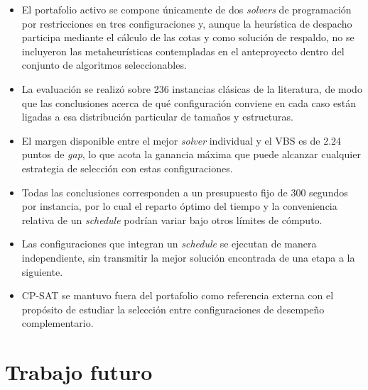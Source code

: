 \begin{itemize}
  \item El portafolio activo se compone únicamente de dos \textit{solvers} de
    programación por restricciones en tres configuraciones y, aunque la
    heurística de despacho participa mediante el cálculo de las cotas y como
    solución de respaldo, no se incluyeron las metaheurísticas contempladas en
    el anteproyecto dentro del conjunto de algoritmos seleccionables.
  \item La evaluación se realizó sobre 236 instancias clásicas de la
    literatura, de modo que las conclusiones acerca de qué configuración
    conviene en cada caso están ligadas a esa distribución particular de tamaños
    y estructuras.
  \item El margen disponible entre el mejor \textit{solver} individual y el VBS
    es de 2.24 puntos de \textit{gap}, lo que acota la ganancia máxima que
    puede alcanzar cualquier estrategia de selección con estas configuraciones.
  \item Todas las conclusiones corresponden a un presupuesto fijo de 300
    segundos por instancia, por lo cual el reparto óptimo del tiempo y la
    conveniencia relativa de un \textit{schedule} podrían variar bajo otros
    límites de cómputo.
  \item Las configuraciones que integran un \textit{schedule} se ejecutan de
    manera independiente, sin transmitir la mejor solución encontrada de una
    etapa a la siguiente.
  \item CP-SAT se mantuvo fuera del portafolio como referencia externa con el
    propósito de estudiar la selección entre configuraciones de desempeño
    complementario.
\end{itemize}

\section{Trabajo futuro}
\label{sec:trabajo_futuro}


